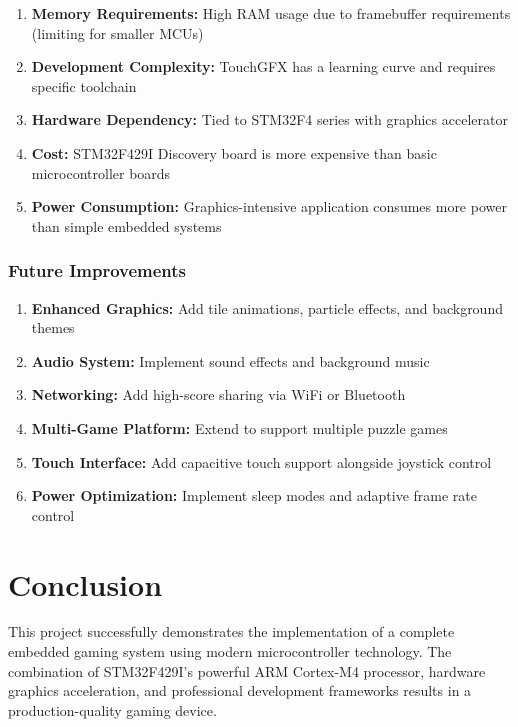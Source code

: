 \documentclass[12pt,a4paper]{article}
\begin{document}
\begin{enumerate}[leftmargin=*]
    \item \textbf{Memory Requirements:} High RAM usage due to framebuffer requirements (limiting for smaller MCUs)
    \item \textbf{Development Complexity:} TouchGFX has a learning curve and requires specific toolchain
    \item \textbf{Hardware Dependency:} Tied to STM32F4 series with graphics accelerator
    \item \textbf{Cost:} STM32F429I Discovery board is more expensive than basic microcontroller boards
    \item \textbf{Power Consumption:} Graphics-intensive application consumes more power than simple embedded systems
\end{enumerate}

\subsubsection{Future Improvements}

\begin{enumerate}[leftmargin=*]
    \item \textbf{Enhanced Graphics:} Add tile animations, particle effects, and background themes
    \item \textbf{Audio System:} Implement sound effects and background music
    \item \textbf{Networking:} Add high-score sharing via WiFi or Bluetooth
    \item \textbf{Multi-Game Platform:} Extend to support multiple puzzle games
    \item \textbf{Touch Interface:} Add capacitive touch support alongside joystick control
    \item \textbf{Power Optimization:} Implement sleep modes and adaptive frame rate control
\end{enumerate}

\newpage

\section{Conclusion}

This project successfully demonstrates the implementation of a complete embedded gaming system using modern microcontroller technology. The combination of STM32F429I's powerful ARM Cortex-M4 processor, hardware graphics acceleration, and professional development frameworks results in a production-quality gaming device.
\end{document}
